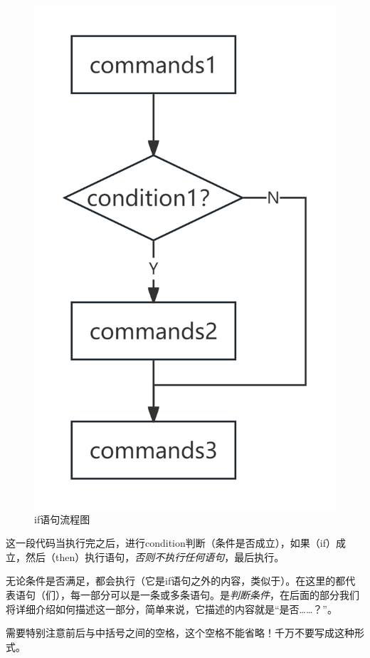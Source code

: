 \begin{figure}
    \centering
    \includegraphics[width=1\linewidth]{Linux基础/Shell脚本基础/判断语句/fig/if语句.png}
    \caption{if语句流程图}
    \label{fig:判断语句-if语句流程图}
\end{figure}

这一段代码当执行完之后，进行condition判断（条件是否成立），如果（if）成立，然后（then）执行语句，\emph{否则不执行任何语句}，最后执行。

\begin{attention}
    无论条件是否满足，都会执行（它是if语句之外的内容，类似于）。在这里的都代表语句（们），每一部分可以是一条或多条语句。是\emph{判断条件}，在后面的部分我们将详细介绍如何描述这一部分，简单来说，它描述的内容就是“是否……？”。

    需要特别注意前后与中括号之间的空格，这个空格不能省略！千万不要写成\code{[condition]}这种形式。
\end{attention}

